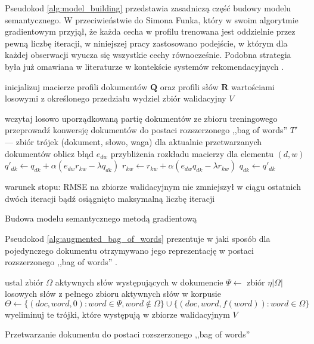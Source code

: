 \documentclass{pracamgr}
\newcommand{\abs}[1]{\lvert#1\rvert}
\begin{document}
Pseudokod \ref{alg:model_building} przedstawia zasadniczą część budowy modelu semantycznego. W przeciwieństwie do Simona Funka, który w swoim algorytmie gradientowym przyjął, że każda cecha w profilu trenowana jest oddzielnie przez pewną liczbę iteracji, w niniejszej pracy zastosowano podejście, w którym dla każdej obserwacji wyucza się wszystkie cechy równocześnie. Podobna strategia była już omawiana w literaturze w kontekście systemów rekomendacyjnych \cite{takacs}. 

\begin{algorithm}

inicjalizuj macierze profili dokumentów $\mathbf{Q}$ oraz profili słów $\mathbf{R}$ wartościami losowymi z określonego przedziału\;
wydziel zbiór walidacyjny $V$\;
 {
    wczytaj losowo uporządkowaną partię dokumentów ze zbioru treningowego\;
    przeprowadź konwersję dokumentów do postaci rozszerzonego ,,bag of words''\;
    $T'$ --- zbiór trójek (dokument, słowo, waga) dla aktualnie przetwarzanych dokumentów\;
     {
        oblicz błąd $e_{dw}$ przybliżenia rozkładu macierzy dla elementu $(d, w)$\;
         { 
            $q'_{dk} \gets q_{dk} + \alpha (e_{dw} r_{kw} - \lambda q_{dk})$\;
            $r_{kw} \gets r_{kw} + \alpha (e_{dw} q_{dk} - \lambda r_{kw})$\;
            $q_{dk} \gets q'_{dk}$\;
        }
    }
    
    warunek stopu: RMSE na zbiorze walidacyjnym nie zmniejszył w ciągu ostatnich dwóch iteracji bądź osiągnięto maksymalną liczbę iteracji
}
\caption{Budowa modelu semantycznego metodą gradientową}
\label{alg:model_building}
\end{algorithm}

Pseudokod \ref{alg:augmented_bag_of_words} prezentuje w jaki sposób dla pojedynczego dokumentu otrzymywano jego reprezentację w postaci rozszerzonego ,,bag of words'' .

\begin{algorithm}

ustal zbiór $\Omega$ aktywnych słów występujących w dokumencie\;
$\Psi \gets $ zbiór $\eta \abs{\Omega}$ losowych słów z pełnego zbioru aktywnych słów w korpusie\;
$\Theta \gets \{ (doc, word, 0) : word \in \Psi, word \notin \Omega\} \cup \{(doc, word, f(word)) : word \in \Omega\}$\;
wyeliminuj te trójki, które występują w zbiorze walidacyjnym $V$\;

\caption{Przetwarzanie dokumentu do postaci rozszerzonego ,,bag of words''}
\label{alg:augmented_bag_of_words}
\end{algorithm}
\end{document}
